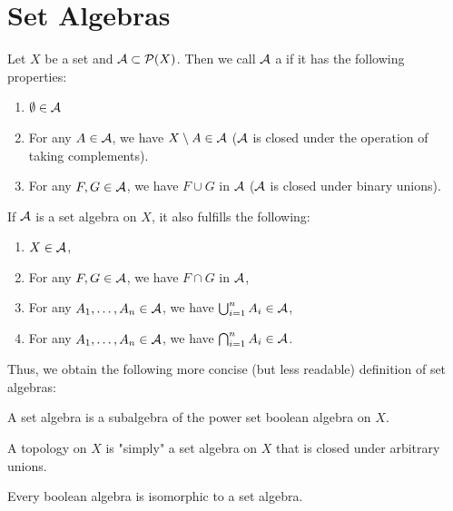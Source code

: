\clearpage

\section{Set Algebras}
\begin{definition}
	Let $X$ be a set and $\mathcal{A} \subset \mathcal{P}(X)$. Then we call $\mathcal{A}$ a  if it has the following properties:
	\begin{enumerate}
		\item $\emptyset \in \mathcal{A}$
		\item For any $A \in \mathcal{A}$, we have $X \setminus A \in \mathcal{A}$ ($\mathcal{A}$ is closed under the operation of taking complements).
		\item For any $F,G \in \mathcal{A}$, we have $F \cup G$ in $\mathcal{A}$ ($\mathcal{A}$ is closed under binary unions).
	\end{enumerate}
\end{definition}
\begin{corollary}
	If $\mathcal{A}$ is a set algebra on $X$, it also fulfills the following:
	\begin{enumerate}
		\item $X \in \mathcal{A}$,
		\item For any $F,G \in \mathcal{A}$, we have $F \cap G$ in $\mathcal{A}$,
		\item For any $A_1, \hdots, A_n \in \mathcal{A}$, we have $\bigcup_{i = 1}^n A_i \in \mathcal{A}$,
		\item For any $A_1, \hdots, A_n \in \mathcal{A}$, we have $\bigcap_{i = 1}^n A_i \in \mathcal{A}$. 
	\end{enumerate}
\end{corollary}
Thus, we obtain the following more concise (but less readable) definition of set algebras:
\begin{corollary}
	A set algebra is a subalgebra of the power set boolean algebra on $X$.
\end{corollary}
\begin{corollary}
	A topology on $X$ is "simply" a set algebra on $X$ that is closed under arbitrary unions.
\end{corollary}
\begin{theorem}
	 Every boolean algebra is isomorphic to a set algebra.
\end{theorem}
